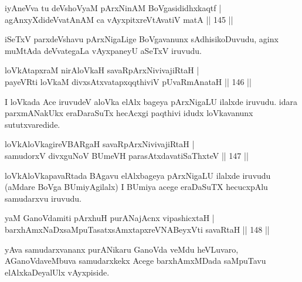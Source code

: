 
\begin{shl}
iyAneVva tu deVshoV\s yaM pArxNinAM BoVgasididhxkaqtf |\\
agAnxyXdideVvatAnAM ca vAyxpitxreVtAvatiV matA \hfill || 145 ||
\end{shl}

\begin{artha}
iSeTxV parxdeVshavu pArxNigaLige BoVgavanunx sAdhisikoDuvudu, aginx muMtAda deVvategaLa vAyxpaneyU aSeTxV iruvudu.
\end{artha}


\begin{shl}
loVkAtapxraM nirAloVkaH savaRpArxNivivajiRtaH |\\
payeVRti loVkaM divxsAtxvatapxqqthiviV pUvaRmAnataH \hfill || 146 ||
\end{shl}

\begin{artha}
I loVkada Ace iruvudeV aloVka elAlx bageya pArxNigaLU ilalxde iruvudu. idara parxmANakUkx eraDaraSuTx hecAcxgi paqthivi idudx loVkavanunx sututxvaredide.
\end{artha}

\begin{shl}
loVkAloVkagireVBARgaH savaRpArxNivivajiRtaH |\\
samudorxV divxguNoV BUmeVH parasAtxdavatiSaThxteV \hfill || 147 ||
\end{shl}

\begin{artha}
loVkAloVkapavaRtada BAgavu elAlxbageya pArxNigaLU ilalxde iruvudu (aMdare BoVga BUmiyAgilalx) I BUmiya acege eraDaSuTX hecucxpAlu samudarxvu iruvudu.
\end{artha}

\begin{shl}
\footnotemark{}yaM GanoVdamiti pArxhuH purANajAcnx vipashicxtaH |\\
barxhAmxNaDxsaMpuTasatxsAmxtapxreVNABeyxVti savaRtaH \hfill || 148 ||
\end{shl}

\begin{artha}
yAva samudarxvananx purANikaru GanoVda veMdu heVLuvaro, AGanoVdaveMbuva samudarxkekx Acege barxhAmxMDada saMpuTavu elAlxkaDeyalUlx vAyxpiside.
\end{artha}

